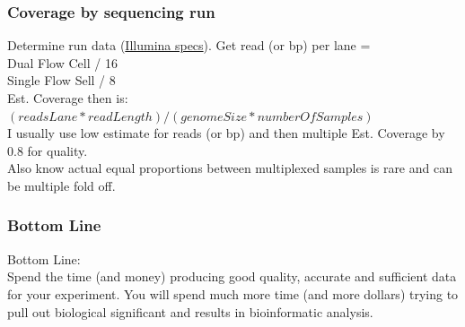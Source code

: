 \documentclass[pdf]{beamer}
\begin{document}
\begin{frame}
\frametitle{Coverage by sequencing run}
Determine run data (\href{http://www.illumina.com/systems/hiseq_2500_1500/performance_specifications.ilmn}{Illumina specs}).
\vspace{0.2in}
Get read (or bp) per lane = \\
Dual Flow Cell / 16
\\
Single Flow Sell / 8\\

Est. Coverage then is: $(readsLane*readLength)/(genomeSize*numberOfSamples)$\\
\vspace{0.2in}
I usually use low estimate for reads (or bp) and then multiple Est. Coverage by 0.8 for quality. \\
\vspace{0.2in}
Also know actual equal proportions between multiplexed samples is rare and can be multiple fold off.\\
\end{frame}

\begin{frame}
\frametitle{Bottom Line}
Bottom Line:\\
Spend the time (and money) producing good quality, accurate and sufficient data for your experiment. You will spend much more time (and more dollars) trying to pull out biological significant and results in bioinformatic analysis. 
\end{frame}
\end{document}
